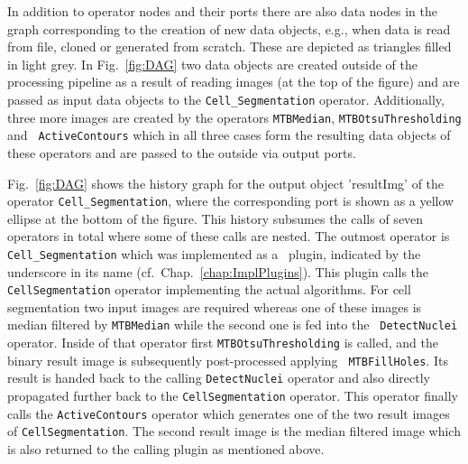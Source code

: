 \vspace*{-1.25cm}
In addition to operator nodes and their ports there are also data nodes in the graph 
corresponding to the creation of new data objects, e.g., when data is read from
file, cloned or generated from scratch. These are depicted as triangles filled
in light grey.
In Fig.~\ref{fig:DAG} two data objects are created outside of the
processing pipeline as a result of reading images (at the top of the figure) and
are passed as input data objects to the {\tt Cell\_Segmentation} operator. 
Additionally, three more images are created by the operators {\tt MTBMedian}, {\tt MTBOtsuThresholding} and {\tt
ActiveContours} which in all three cases form the resulting data objects of these operators
and are passed to the outside via output ports.

Fig.~\ref{fig:DAG} shows the history graph for the output object 'resultImg' of
the operator {\tt Cell\_Segmentation}, where the corresponding port is shown as
a yellow ellipse at the bottom of the figure.
This history subsumes the calls of seven operators in total where some of these
calls are nested. The outmost operator is {\tt Cell\_Segmentation} which was
implemented as a \mitobo\ plugin, indicated by the underscore in its name
(cf.~Chap.~\ref{chap:ImplPlugins}). This plugin calls the {\tt CellSegmentation}
operator implementing the actual algorithms. For cell segmentation two input
images are required whereas one of these images is median
filtered by {\tt MTBMedian} while the second one is fed into the {\tt
DetectNuclei} operator. Inside of that operator
first {\tt MTBOtsuThresholding} is called, and the binary result image is subsequently post-processed applying {\tt
MTBFillHoles}. Its result is handed back to the calling {\tt DetectNuclei} operator and also directly propagated further back
to the {\tt CellSegmentation} operator. This operator finally calls the {\tt ActiveContours} operator which
generates one of the two result images of {\tt CellSegmentation}. The second result image is the median
filtered image which is also returned to the calling plugin as mentioned above.

